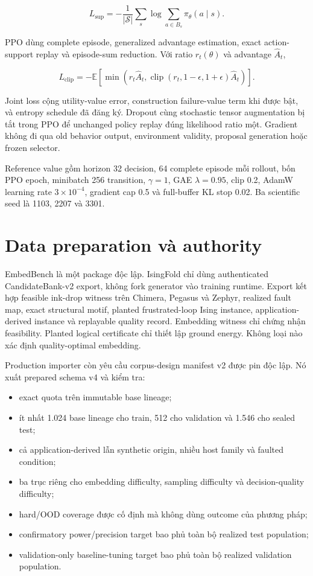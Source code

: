 \documentclass[
  vietnamese,
  10pt,
  a4paper,
]{article}
\providecommand{\tightlist}{%
  \setlength{\itemsep}{0pt}\setlength{\parskip}{0pt}}
\begin{document}
\[
L_{\mathrm{sup}}
=-\frac{1}{|\mathcal S|}\sum_s
\log\sum_{a\in B_s}\pi_\theta(a\mid s).
\]

PPO dùng complete episode, generalized advantage estimation, exact
action-support replay và episode-sum reduction. Với ratio
\(r_t(\theta)\) và advantage \(\widehat A_t\),

\[
L_{\mathrm{clip}}
=-\mathbb E\!\left[
\min\left(r_t\widehat A_t,
\operatorname{clip}(r_t,1-\epsilon,1+\epsilon)\widehat A_t\right)
\right].
\]

Joint loss cộng utility-value error, construction failure-value term khi
được bật, và entropy schedule đã đăng ký. Dropout cùng stochastic tensor
augmentation bị tắt trong PPO để unchanged policy replay đúng likelihood
ratio một. Gradient không đi qua old behavior output, environment
validity, proposal generation hoặc frozen selector.

Reference value gồm horizon 32 decision, 64 complete episode mỗi
rollout, bốn PPO epoch, minibatch 256 transition, \(\gamma=1\), GAE
\(\lambda=0.95\), clip 0.2, AdamW learning rate \(3\times10^{-4}\),
gradient cap 0.5 và full-buffer KL stop 0.02. Ba scientific seed là
1103, 2207 và 3301.

\section{Data preparation và
authority}\label{data-preparation-vuxe0-authority}

EmbedBench là một package độc lập. IsingFold chỉ dùng authenticated
CandidateBank-v2 export, không fork generator vào training runtime.
Export kết hợp feasible ink-drop witness trên Chimera, Pegasus và
Zephyr, realized fault map, exact structural motif, planted
frustrated-loop Ising instance, application-derived instance và
replayable quality record. Embedding witness chỉ chứng nhận feasibility.
Planted logical certificate chỉ thiết lập ground energy. Không loại nào
xác định quality-optimal embedding.

Production importer còn yêu cầu corpus-design manifest v2 được pin độc
lập. Nó xuất prepared schema v4 và kiểm tra:

\begin{itemize}
\tightlist
\item
  exact quota trên immutable base lineage;
\item
  ít nhất 1.024 base lineage cho train, 512 cho validation và 1.546 cho
  sealed test;
\item
  cả application-derived lẫn synthetic origin, nhiều host family và
  faulted condition;
\item
  ba trục riêng cho embedding difficulty, sampling difficulty và
  decision-quality difficulty;
\item
  hard/OOD coverage được cố định mà không dùng outcome của phương pháp;
\item
  confirmatory power/precision target bao phủ toàn bộ realized test
  population;
\item
  validation-only baseline-tuning target bao phủ toàn bộ realized
  validation population.
\end{itemize}
\end{document}
